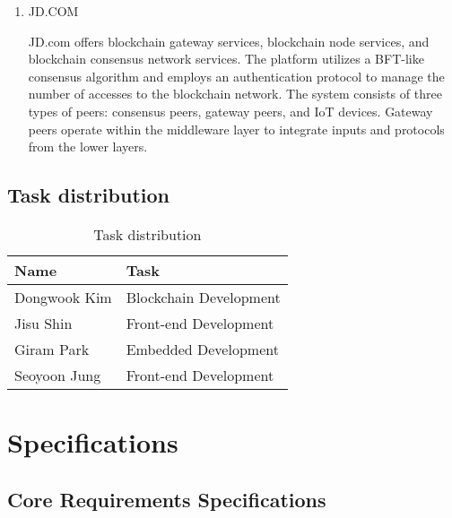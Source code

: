 \documentclass[conference]{IEEEtran}
\begin{document}
\begin{enumerate}[itemsep=2ex, parsep=1ex]
	\item JD.COM
	      	      
	      JD.com offers blockchain gateway services, blockchain node services, and
	      blockchain consensus network services. The platform utilizes a BFT-like consensus
	      algorithm and employs an authentication protocol to manage the number of accesses
	      to the blockchain network. The system consists of three types of peers: consensus
	      peers, gateway peers, and IoT devices. Gateway peers operate within the
	      middleware layer to integrate inputs and protocols from the lower layers.
\end{enumerate}

\subsection{Task distribution }

\begin{table}[h!]
	\caption{Task distribution}
	\def\arraystretch{1.4} \small
	\begin{tabular}{|p{3cm}|p{4.6cm}|}
		\hline
		Name         & Task                   \\
		\hline
		Dongwook Kim & Blockchain Development \\
		\hline
		Jisu Shin    & Front-end Development  \\
		\hline
		Giram Park   & Embedded Development   \\
		\hline
		Seoyoon Jung & Front-end Development  \\
		\hline
	\end{tabular}
\end{table}

\section{Specifications}

\subsection{Core Requirements Specifications}
\end{document}
